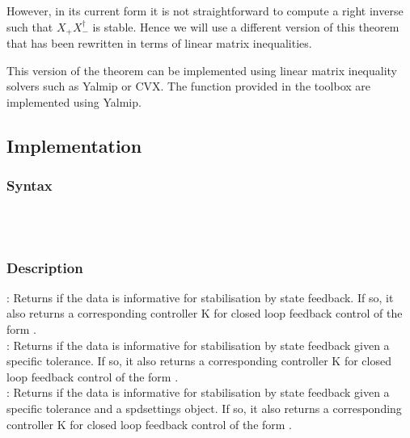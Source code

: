 However, in its current form it is not straightforward to compute a right inverse such that $X_+ X_-^\dagger$ is stable. Hence we will use a different version of this theorem that has been rewritten in terms of linear matrix inequalities.


This version of the theorem can be implemented using linear matrix inequality solvers such as Yalmip or CVX. The function provided in the toolbox are implemented using Yalmip.

\subsection{Implementation}
\subsubsection*{Syntax}
 \\
 \\

\subsubsection*{Description}
: Returns if the data is informative for stabilisation by state feedback. If so, it also returns a corresponding controller K for closed loop feedback control of the form .\\
: Returns if the data is informative for stabilisation by state feedback given a specific tolerance. If so, it also returns a corresponding controller K for closed loop feedback control of the form .\\
: Returns if the data is informative for stabilisation by state feedback given a specific tolerance and a spdsettings object. If so, it also returns a corresponding controller K for closed loop feedback control of the form .

